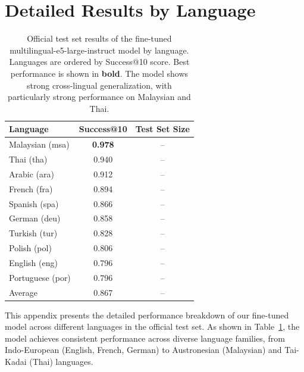 \documentclass[11pt]{article}
\begin{document}
\appendix

\section{Detailed Results by Language}
\label{sec:appendix-results}

\begin{table}[t]
  \centering
  \small
  \begin{tabular}{lcc}
    \hline
    \textbf{Language} & \textbf{Success@10} & \textbf{Test Set Size} \\
    \hline
    Malaysian (msa) & \textbf{0.978} & -- \\
    Thai (tha) & 0.940 & -- \\
    Arabic (ara) & 0.912 & -- \\
    French (fra) & 0.894 & -- \\
    Spanish (spa) & 0.866 & -- \\
    German (deu) & 0.858 & -- \\
    Turkish (tur) & 0.828 & -- \\
    Polish (pol) & 0.806 & -- \\
    English (eng) & 0.796 & -- \\
    Portuguese (por) & 0.796 & -- \\
    \hline
    Average & 0.867 & -- \\
    \hline
  \end{tabular}
  \caption{Official test set results of the fine-tuned multilingual-e5-large-instruct model by language. Languages are ordered by Success@10 score. Best performance is shown in \textbf{bold}. The model shows strong cross-lingual generalization, with particularly strong performance on Malaysian and Thai.}
  \label{tab:test-results-by-language}
\end{table}

This appendix presents the detailed performance breakdown of our fine-tuned model across different languages in the official test set. As shown in Table~\ref{tab:test-results-by-language}, the model achieves consistent performance across diverse language families, from Indo-European (English, French, German) to Austronesian (Malaysian) and Tai-Kadai (Thai) languages.
\end{document}

